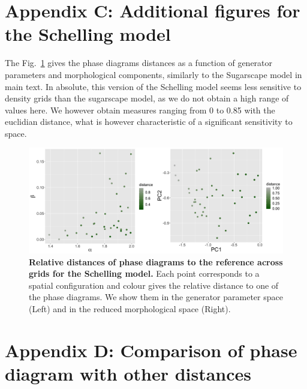 \documentclass{JASSS}
\begin{document}
\section{Appendix C: Additional figures for the Schelling model}

The Fig.~\ref{fig:schelling-distance-meta} gives the phase diagrams distances as a function of generator parameters and morphological components, similarly to the Sugarscape model in main text. In absolute, this version of the Schelling model seems less sensitive to density grids than the sugarscape model, as we do not obtain a high range of values here. We however obtain measures ranging from 0 to 0.85 with the euclidian distance, what is however characteristic of a significant sensitivity to space.


\begin{figure}[!t]
\centering
\includegraphics[width=\textwidth]{figures/Fig8.png}
\caption{\textbf{Relative distances of phase diagrams to the reference across grids for the Schelling model.} Each point corresponds to a spatial configuration and colour gives the relative distance to one of the phase diagrams. We show them in the generator parameter space (Left) and in the reduced morphological space (Right).\label{fig:schelling-distance-meta}}
\end{figure}


\section{Appendix D: Comparison of phase diagram with other distances}

\label{app:distances}
\end{document}
